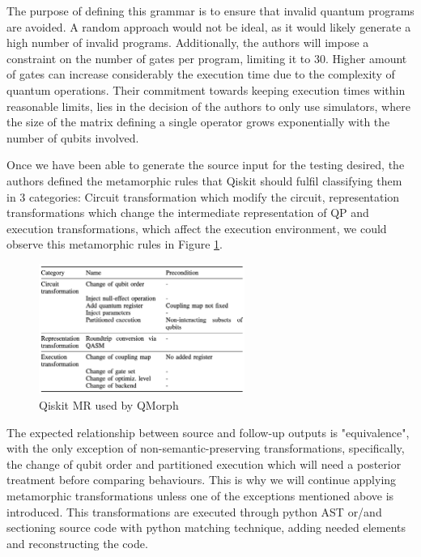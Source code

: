 \begin{itemize}
The purpose of defining this grammar is to ensure that invalid quantum programs are avoided. A random approach would not be ideal, as it would likely generate a high number of invalid programs. Additionally, the authors will impose a constraint on the number of gates per program, limiting it to 30. Higher amount of gates can increase considerably the execution time due to the complexity of quantum operations. Their commitment towards keeping execution times within reasonable limits, lies in the decision of the authors to only use simulators, where the size of the matrix defining a single operator grows exponentially with the number of qubits involved.\newline

Once we have been able to generate the source input for the testing desired, the authors defined the metamorphic rules that Qiskit should fulfil classifying them in 3 categories: Circuit transformation which modify the circuit, representation transformations which change the intermediate representation of QP and execution transformations, which affect the execution environment, we could observe this metamorphic rules in Figure \ref{Fig:MorphQMR}. 

\begin{figure}[H]
        \centering
        \includegraphics[width=0.6\textwidth]{TFM/photos/MorphQMR.png}
        \caption{Qiskit MR used by QMorph \cite{paltenghi2023morphq}} 
        \label{Fig:MorphQMR}
\end{figure}

The expected relationship between source and follow-up outputs is "equivalence", with the only exception of non-semantic-preserving transformations, specifically, the change of qubit order and partitioned execution which will need a posterior treatment before comparing behaviours. This is why we will continue applying metamorphic transformations unless one of the exceptions mentioned above is introduced. This transformations are executed through python AST or/and sectioning source code with python matching technique, adding needed elements and reconstructing the code.\newline


\end{itemize}
